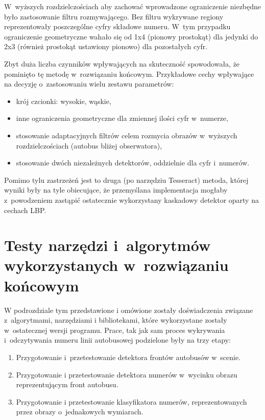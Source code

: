 W~wyższych rozdzielczościach aby zachować wprowadzone ograniczenie
niezbędne było zastosowanie filtru rozmywającego. Bez filtru
wykrywane regiony reprezentowały poszczególne cyfry składowe numeru.
W~tym przypadku ograniczenie geometryczne wahało się od 1x4 (pionowy
prostokąt) dla jedynki do 2x3 (również prostokąt ustawiony pionowo) dla
pozostałych cyfr.

Zbyt duża liczba czynników wpływających na skuteczność
spowodowała, że pominięto tę metodę w~rozwiązaniu końcowym.
Przykładowe cechy wpływające na decyzję o~zastosowaniu wielu
zestawu parametrów:

\begin{itemize}
    \item krój czcionki: wysokie, wąskie,
    \item inne ograniczenia geometryczne dla zmiennej ilości cyfr
        w~numerze,
    \item stosowanie adaptacyjnych filtrów celem rozmycia obrazów
        w~wyższych rozdzielczościach (autobus bliżej obserwatora),
    \item stosowanie dwóch niezależnych detektorów, oddzielnie dla
        cyfr i~numerów.
\end{itemize}


Pomimo tylu zastrzeżeń jest to druga (po narzędziu Tesseract) metoda, której
wyniki były na tyle obiecujące, że przemyślana implementacja
mogłaby z~powodzeniem zastąpić ostatecznie wykorzystany kaskadowy
detektor oparty na cechach LBP.


\section{Testy narzędzi i~algorytmów wykorzystanych w~rozwiązaniu 
	końcowym}
\label{sec:testynarzedziwykorzystanych}

W podrozdziale tym przedstawione i omówione zostały doświadczenia związane
z~algorytmami, narzędziami i bibliotekami, które wykorzystane zostały
w~ostatecznej wersji programu. Prace, tak jak sam proces wykrywania 
i~odczytywania numeru linii autobusowej podzielone były na trzy etapy:

\begin{enumerate}
	\item Przygotowanie i~przetestowanie detektora frontów autobusów w~scenie.
	\item Przygotowanie i przetestowanie detektora numerów w~wycinku obrazu
	reprezentującym front autobusu.
	\item Przygotowanie i przetestowanie klasyfikatora numerów, reprezentowanych
	przez obrazy o~jednakowych wymiarach.
\end{enumerate}

